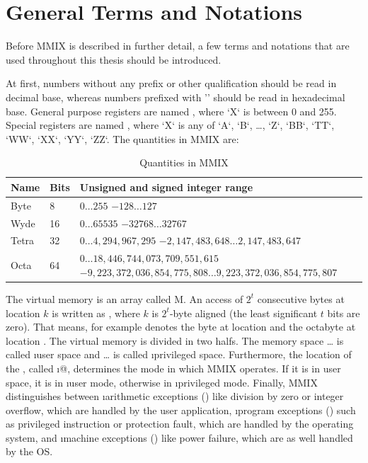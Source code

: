\section{General Terms and Notations}

Before MMIX is described in further detail, a few terms and notations that are used throughout this thesis should be introduced.

At first, numbers without any prefix or other qualification should be read in decimal base, whereas numbers prefixed with '\haddr{}' should be read in hexadecimal base. General purpose registers are named , where `X` is between 0 and 255. Special registers are named , where `X` is any of `A`, `B`, \dots, `Z`, `BB`, `TT`, `WW`, `XX`, `YY`, `ZZ`. The quantities in MMIX are:
\begin{table}[H]
	\begin{tabular}{| p{13mm} | p{13mm} | p{105mm} |}
		\hline \textbf{Name} & \textbf{Bits} & \textbf{Unsigned and signed integer range} \\
		\hline Byte & 8 &
		$0 \dots 255$ \newline
		$-128 \dots 127$
		\\
		\hline Wyde & 16 &
		$0 \dots 65535$ \newline
		$-32768 \dots 32767$
		\\
		\hline Tetra & 32 &
		$0 \dots 4,294,967,295$ \newline
		$-2,147,483,648 \dots 2,147,483,647$
		\\
		\hline Octa & 64 &
		$0 \dots 18,446,744,073,709,551,615$ \newline
		$-9,223,372,036,854,775,808 \dots 9,223,372,036,854,775,807$
		\\
		\hline
	\end{tabular}
	\caption{Quantities in MMIX \citep[pg. 3]{mmix-doc}}
\end{table}

The virtual memory is an array called M. An access of $2^t$ consecutive bytes at location $k$ is written as , where $k$ is $2^t$-byte aligned (the least significant $t$ bits are zero). That means, for example  denotes the byte at location  and  the octabyte at location . The virtual memory is divided in two halfs. The memory space  \dots {} is called \i{user space} and  \dots {} is called \i{privileged space}. Furthermore, the location of the , called \i{@}, determines the mode in which MMIX operates. If it is in user space, it is in \i{user mode}, otherwise in \i{privileged mode}. Finally, MMIX distinguishes between \i{arithmetic exceptions} () like division by zero or integer overflow, which are handled by the user application, \i{program exceptions} () such as privileged instruction or protection fault, which are handled by the operating system, and \i{machine exceptions} () like power failure, which are as well handled by the OS.

